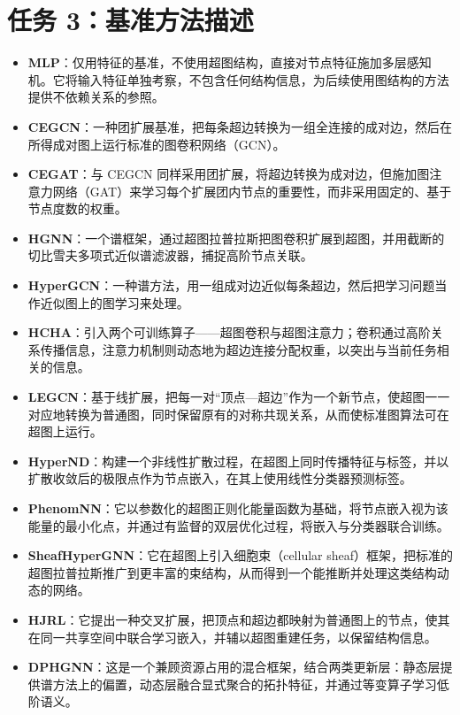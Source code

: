 \documentclass[11pt,a4paper]{article}
\begin{document}
\section*{任务 3：基准方法描述}
\begin{itemize}
\item \textbf{MLP}：仅用特征的基准，不使用超图结构，直接对节点特征施加多层感知机。它将输入特征单独考察，不包含任何结构信息，为后续使用图结构的方法提供不依赖关系的参照。
\item \textbf{CEGCN}\cite{chien2022allset}：一种团扩展基准，把每条超边转换为一组全连接的成对边，然后在所得成对图上运行标准的图卷积网络（GCN）。
\item \textbf{CEGAT}\cite{chien2022allset}：与 CEGCN 同样采用团扩展，将超边转换为成对边，但施加图注意力网络（GAT）来学习每个扩展团内节点的重要性，而非采用固定的、基于节点度数的权重。
\item \textbf{HGNN}\cite{feng2019hgnn}：一个谱框架，通过超图拉普拉斯把图卷积扩展到超图，并用截断的切比雪夫多项式近似谱滤波器，捕捉高阶节点关联。
\item \textbf{HyperGCN}\cite{yadati2019hypergcn}：一种谱方法，用一组成对边近似每条超边，然后把学习问题当作近似图上的图学习来处理。
\item \textbf{HCHA}\cite{bai2021hcha}：引入两个可训练算子——超图卷积与超图注意力；卷积通过高阶关系传播信息，注意力机制则动态地为超边连接分配权重，以突出与当前任务相关的信息。
\item \textbf{LEGCN}\cite{yang2022legcn}：基于线扩展，把每一对“顶点—超边”作为一个新节点，使超图一一对应地转换为普通图，同时保留原有的对称共现关系，从而使标准图算法可在超图上运行。
\item \textbf{HyperND}\cite{prokopchik2022hypernd}：构建一个非线性扩散过程，在超图上同时传播特征与标签，并以扩散收敛后的极限点作为节点嵌入，在其上使用线性分类器预测标签。
\item \textbf{PhenomNN}\cite{wang2023phenomnn}：它以参数化的超图正则化能量函数为基础，将节点嵌入视为该能量的最小化点，并通过有监督的双层优化过程，将嵌入与分类器联合训练。
\item \textbf{SheafHyperGNN}\cite{duta2023sheaf}：它在超图上引入细胞束（cellular sheaf）框架，把标准的超图拉普拉斯推广到更丰富的束结构，从而得到一个能推断并处理这类结构动态的网络。
\item \textbf{HJRL}\cite{yan2024hjrl}：它提出一种交叉扩展，把顶点和超边都映射为普通图上的节点，使其在同一共享空间中联合学习嵌入，并辅以超图重建任务，以保留结构信息。
\item \textbf{DPHGNN}\cite{saxena2024dphgnn}：这是一个兼顾资源占用的混合框架，结合两类更新层：静态层提供谱方法上的偏置，动态层融合显式聚合的拓扑特征，并通过等变算子学习低阶语义。

\end{itemize}
\end{document}
